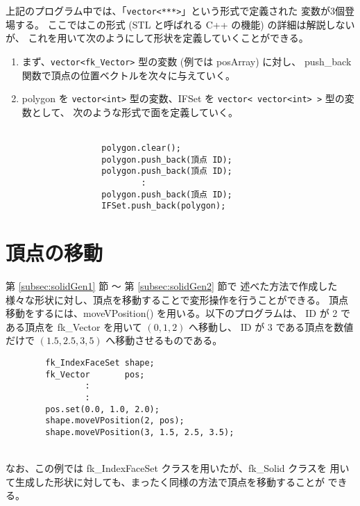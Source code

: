 上記のプログラム中では、「\verb+vector<***>+」という形式で定義された
変数が3個登場する。
ここではこの形式 (STL と呼ばれる C++ の機能) の詳細は解説しないが、
これを用いて次のようにして形状を定義していくことができる。
\begin{enumerate}
 \item まず、\verb+vector<fk_Vector>+ 型の変数 (例では posArray) に対し、
	push\_back 関数で頂点の位置ベクトルを次々に与えていく。

 \item polygon を \verb+vector<int>+ 型の変数、IFSet を
	\verb+vector< vector<int> >+ 型の変数として、
	次のような形式で面を定義していく。\\ ~ \\
	\begin{screen}
	\begin{verbatim}
                polygon.clear();
                polygon.push_back(頂点 ID);
                polygon.push_back(頂点 ID);
                        :
                polygon.push_back(頂点 ID);
                IFSet.push_back(polygon);
	\end{verbatim}
	\end{screen}
\end{enumerate}

\section{頂点の移動} \label{subsec:movevertex}
第 \ref{subsec:solidGen1} 節 〜 第 \ref{subsec:solidGen2} 節で
述べた方法で作成した
様々な形状に対し、頂点を移動することで変形操作を行うことができる。
頂点移動をするには、moveVPosition() を用いる。以下のプログラムは、
ID が 2 である頂点を fk\_Vector を用いて \((0, 1, 2)\) へ移動し、
ID が 3 である頂点を数値だけで \((1.5, 2.5, 3,5)\) へ移動させるものである。
\\
\begin{breakbox}
\begin{verbatim}
        fk_IndexFaceSet shape;
        fk_Vector       pos;
                :
                :
        pos.set(0.0, 1.0, 2.0);
        shape.moveVPosition(2, pos);
        shape.moveVPosition(3, 1.5, 2.5, 3.5);
\end{verbatim}
\end{breakbox}
~ \\
なお、この例では fk\_IndexFaceSet クラスを用いたが、fk\_Solid クラスを
用いて生成した形状に対しても、まったく同様の方法で頂点を移動することが
できる。


